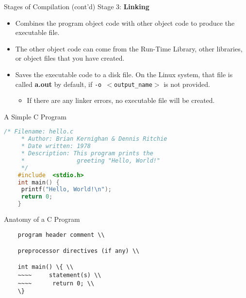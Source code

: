 \documentclass[graphics]{beamer}
\begin{document}
\begin{frame}{Stages of Compilation (cont'd)}
    Stage 3: \textbf{Linking}
    \begin{itemize}
        \item Combines the program object code with other object code to produce the executable file.
        \item The other object code can come from the Run-Time Library, other libraries, or object files that you have created.
        \item Saves the executable code to a disk file.  On the Linux system, that file is called \textbf{a.out} by default, if \texttt{-o $<$output\_name$>$} is not provided.
        \begin{itemize}
            \item If there are any linker errors, no executable file will be created.
        \end{itemize}
    \end{itemize}
\end{frame}

\begin{frame}[fragile]{A Simple C Program}
    \begin{lstlisting}[language=c,showspaces=false,keywordstyle=\color{magenta},stringstyle=\color{purple},basicstyle=\ttfamily\footnotesize,numberstyle=\tiny\color{codegray},commentstyle=\color{green},]
    /* Filename: hello.c
     * Author: Brian Kernighan & Dennis Ritchie
     * Date written: 1978
     * Description: This program prints the
     *               greeting "Hello, World!"
     */
    #include  <stdio.h>
    int main() {
     printf("Hello, World!\n");
     return 0;
    }
    \end{lstlisting}
\end{frame}

\begin{frame}{Anatomy of a C Program}
    \begin{verbatim}
    program header comment \\

    preprocessor directives (if any) \\
    
    int main() \{ \\
    ~~~~     statement(s) \\
    ~~~~      return 0; \\
    \}
    \end{verbatim}
\end{frame}
\end{document}
